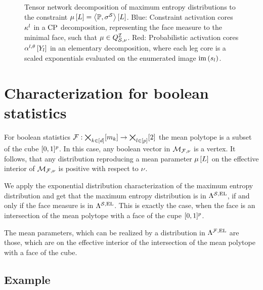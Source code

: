 \documentclass[aps,onecolumn,nofootinbib,pra]{article}
\begin{document}
    \begin{figure}[t]
        \begin{center}
            
        \end{center}
        \caption{
            Tensor network decomposition of maximum entropy distributions to the constraint $\mu\left[L\right]=\left\langle \mathbb{P},\sigma^{\mathcal{S}}\right\rangle \left[ L \right]$.
            Blue: Constraint activation cores $\kappa^{l}$ in a $\mathrm{CP}$ decomposition, representing the face measure to the minimal face, such that $\mu\in Q^{\mathcal{I}}_{\mathcal{S},\nu}$.
            Red: Probabilistic activation cores $\alpha^{l,\theta}\left[Y_{l}\right]$ in an elementary decomposition, where each leg core is a scaled exponentials evaluated on the enumerated image $\mathrm{im}\left(s_{l}\right)$.
        }\label{fig:maxEntropyActcore}
    \end{figure}


    \section{Characterization for boolean statistics}

    For boolean statistics $\mathcal{F}:\bigtimes_{k\in[d]}[m_{k}]\rightarrow\bigtimes_{l\in[p]}[2]$ the mean polytope is a subset of the cube $[0,1]^p$.
    In this case, any boolean vector in $\mathcal{M}_{\mathcal{F},\nu}$ is a vertex.
    It follows, that any distribution reproducing a mean parameter $\mu\left[L\right]$ on the effective interior of $\mathcal{M}_{\mathcal{F},\nu}$ is positive with respect to $\nu$.

    We apply the exponential distribution characterization of the maximum entropy distribution and get that the maximum entropy distribution is in $\Lambda^{\mathcal{S},\mathrm{EL}}$, if and only if the face measure is in $\Lambda^{\mathcal{S},\mathrm{EL}}$.
    This is exactly the case, when the face is an intersection of the mean polytope with a face of the cupe $[0,1]^p$.

    The mean parameters, which can be realized by a distribution in $\Lambda^{\mathcal{F},\mathrm{EL}}$ are those, which are on the effective interior of the intersection of the mean polytope with a face of the cube.


    \subsection{Example}

    
\end{document}
